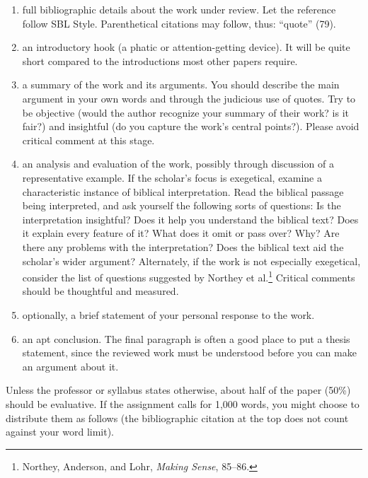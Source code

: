 \documentclass[11pt,twocolumn]{article}
\begin{document}
\begin{enumerate}

\item full bibliographic details about the work under review. Let the
reference follow SBL Style. Parenthetical citations may follow, thus:
“quote” (79).

\item an introductory hook (a phatic or attention-getting device). It
will be quite short compared to the introductions most other papers
require.

\item a summary of the work and its arguments. You should describe the
main argument in your own words and through the judicious use of quotes.
Try to be objective (would the author recognize your summary of their
work? is it fair?) and insightful (do you capture the work's central
points?). Please avoid critical comment at this stage.

\item an analysis and evaluation of the work, possibly through
discussion of a representative example. If the scholar's focus is
exegetical, examine a characteristic instance of biblical
interpretation. Read the biblical passage being interpreted, and ask
yourself the following sorts of questions: Is the interpretation
insightful? Does it help you understand the biblical text? Does it
explain every feature of it? What does it omit or pass over? Why? Are
there any problems with the interpretation? Does the biblical text aid
the scholar’s wider argument? Alternately, if the work is not especially
exegetical, consider the list of questions suggested by Northey et
al.\footnote{Northey, Anderson, and Lohr, \emph{Making Sense}, 85–86.}
Critical comments should be thoughtful and measured.

\item optionally, a brief statement of your personal response to the
work.

\item an apt conclusion. The final paragraph is often a good place to
put a thesis statement, since the reviewed work must be understood
before you can make an argument about it.

\end{enumerate}

Unless the professor or syllabus states otherwise, about half of the
paper (50\%) should be evaluative. If the assignment calls for 1,000
words, you might choose to distribute them as follows (the bibliographic
citation at the top does not count against your word limit).
\end{document}
